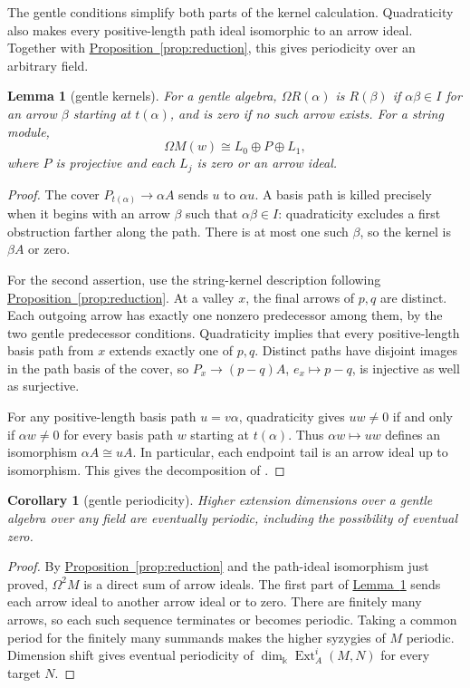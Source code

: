 \documentclass[reqno]{amsart}
\numberwithin{equation}{section}
\newtheorem{lemma}[theorem]{Lemma}
\newtheorem{corollary}[theorem]{Corollary}
\theoremstyle{definition}
\theoremstyle{remark}
\DeclareMathOperator{\Ext}{Ext}
\newcommand{\Om}{\Omega}
\newcommand{\kk}{\Bbbk}
\newcommand{\kdim}{\dim_{\kk}}
\newcommand{\lemref}[1]{\hyperref[#1]{Lemma~\ref*{#1}}}
\newcommand{\propref}[1]{\hyperref[#1]{Proposition~\ref*{#1}}}
\begin{document}
The gentle conditions simplify both parts of the kernel calculation. Quadraticity also makes every positive-length path ideal isomorphic to an arrow ideal. Together with \propref{prop:reduction}, this gives periodicity over an arbitrary field.

\begin{lemma}[gentle kernels]\label{lem:gentle}
For a gentle algebra, \(\Om R(\alpha)\) is \(R(\beta)\) if \(\alpha\beta\in I\) for an arrow \(\beta\) starting at \(t(\alpha)\), and is zero if no such arrow exists. For a string module,
\[
 \Om M(w)\cong L_0\oplus P\oplus L_1,
\]
where \(P\) is projective and each \(L_j\) is zero or an arrow ideal.
\end{lemma}
\begin{proof}
The cover \(P_{t(\alpha)}\to\alpha A\) sends \(u\) to \(\alpha u\). A basis path is killed precisely when it begins with an arrow \(\beta\) such that \(\alpha\beta\in I\): quadraticity excludes a first obstruction farther along the path. There is at most one such \(\beta\), so the kernel is \(\beta A\) or zero.

For the second assertion, use the string-kernel description following \propref{prop:reduction}. At a valley \(x\), the final arrows of \(p,q\) are distinct. Each outgoing arrow has exactly one nonzero predecessor among them, by the two gentle predecessor conditions. Quadraticity implies that every positive-length basis path from \(x\) extends exactly one of \(p,q\). Distinct paths have disjoint images in the path basis of the cover, so \(P_x\to(p-q)A\), \(e_x\mapsto p-q\), is injective as well as surjective.

For any positive-length basis path \(u=v\alpha\), quadraticity gives \(uw\ne0\) if and only if \(\alpha w\ne0\) for every basis path \(w\) starting at \(t(\alpha)\). Thus \(\alpha w\mapsto uw\) defines an isomorphism \(\alpha A\cong uA\). In particular, each endpoint tail is an arrow ideal up to isomorphism. This gives the decomposition of \cite[Proposition~3.1]{BaurSchroll}.
\end{proof}

\begin{corollary}[gentle periodicity]\label{cor:gentle}
Higher extension dimensions over a gentle algebra over any field are eventually periodic, including the possibility of eventual zero.
\end{corollary}
\begin{proof}
By \propref{prop:reduction} and the path-ideal isomorphism just proved, \(\Om^2M\) is a direct sum of arrow ideals. The first part of \lemref{lem:gentle} sends each arrow ideal to another arrow ideal or to zero. There are finitely many arrows, so each such sequence terminates or becomes periodic. Taking a common period for the finitely many summands makes the higher syzygies of \(M\) periodic. Dimension shift gives eventual periodicity of \(\kdim\Ext_A^i(M,N)\) for every target \(N\).
\end{proof}
\end{document}
